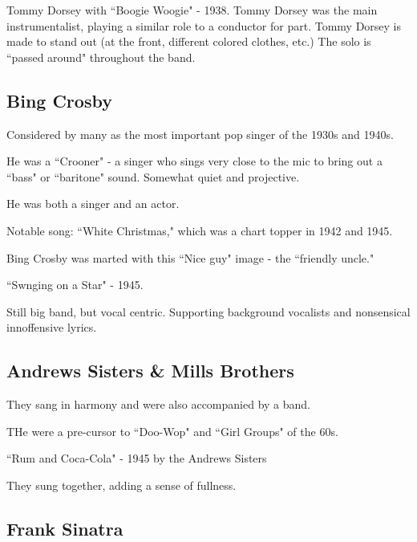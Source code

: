 \documentclass[12pt, a4paper, twoside, openright, titlepage]{book}
\begin{document}
\begin{eg}{}{}
    Tommy Dorsey with ``Boogie Woogie" - 1938. Tommy Dorsey was the main instrumentalist, playing a similar role to a conductor for part. Tommy Dorsey is made to stand out (at the front, different colored clothes, etc.) The solo is ``passed around" throughout the band.
\end{eg}

\subsection{Bing Crosby}

Considered by many as the most important pop singer of the 1930s and 1940s.

\begin{rmk}{}{}
    He was a ``Crooner" - a singer who sings very close to the mic to bring out a ``bass" or ``baritone" sound. Somewhat quiet and projective.
\end{rmk}

He was both a singer and an actor.

\begin{note}{}{}
    Notable song: ``White Christmas," which was a chart topper in 1942 and 1945.
\end{note}

Bing Crosby was marted with this ``Nice guy" image - the ``friendly uncle."

\begin{eg}{}{}
    ``Swnging on a Star" - 1945.

    Still big band, but vocal centric. Supporting background vocalists and nonsensical innoffensive lyrics.
\end{eg}


\subsection{Andrews Sisters \& Mills Brothers}

They sang in harmony and were also accompanied by a band.

THe were a pre-cursor to ``Doo-Wop" and ``Girl Groups" of the 60s.

\begin{eg}{}{}
    ``Rum and Coca-Cola" - 1945 by the Andrews Sisters

    They sung together, adding a sense of fullness.
\end{eg}


\subsection{Frank Sinatra}
\end{document}
